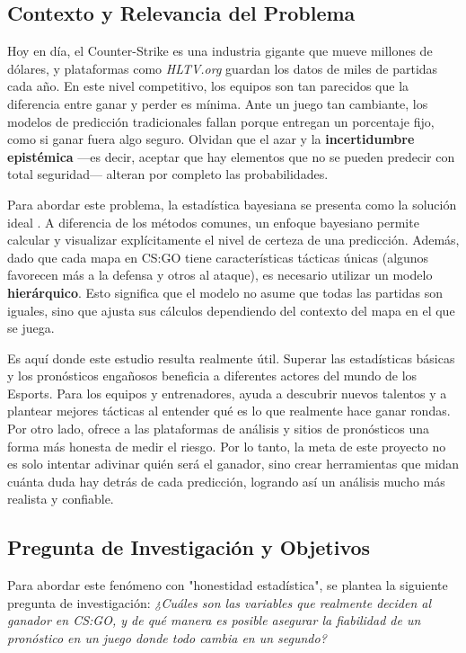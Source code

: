 \documentclass[twocolumn,10pt]{article}
\begin{document}
\subsection{Contexto y Relevancia del Problema}
Hoy en día, el Counter-Strike es una industria gigante que mueve millones de dólares, y plataformas como \textit{HLTV.org} guardan los datos de miles de partidas cada año. En este nivel competitivo, los equipos son tan parecidos que la diferencia entre ganar y perder es mínima. Ante un juego tan cambiante, los modelos de predicción tradicionales fallan porque entregan un porcentaje fijo, como si ganar fuera algo seguro. Olvidan que el azar y la \textbf{incertidumbre epistémica} —es decir, aceptar que hay elementos que no se pueden predecir con total seguridad— alteran por completo las probabilidades.

Para abordar este problema, la estadística bayesiana se presenta como la solución ideal \cite{mcgrayne2011theory}. A diferencia de los métodos comunes, un enfoque bayesiano permite calcular y visualizar explícitamente el nivel de certeza de una predicción. Además, dado que cada mapa en CS:GO tiene características tácticas únicas (algunos favorecen más a la defensa y otros al ataque), es necesario utilizar un modelo \textbf{hierárquico}. Esto significa que el modelo no asume que todas las partidas son iguales, sino que ajusta sus cálculos dependiendo del contexto del mapa en el que se juega.

Es aquí donde este estudio resulta realmente útil. Superar las estadísticas básicas y los pronósticos engañosos beneficia a diferentes actores del mundo de los Esports. Para los equipos y entrenadores, ayuda a descubrir nuevos talentos y a plantear mejores tácticas al entender qué es lo que realmente hace ganar rondas. Por otro lado, ofrece a las plataformas de análisis y sitios de pronósticos una forma más honesta de medir el riesgo. Por lo tanto, la meta de este proyecto no es solo intentar adivinar quién será el ganador, sino crear herramientas que midan cuánta duda hay detrás de cada predicción, logrando así un análisis mucho más realista y confiable.

\subsection{Pregunta de Investigación y Objetivos}
Para abordar este fenómeno con "honestidad estadística", se plantea la siguiente pregunta de investigación: \textit{¿Cuáles son las variables que realmente deciden al ganador en CS:GO, y de qué manera es posible asegurar la fiabilidad de un pronóstico en un juego donde todo cambia en un segundo?}
\end{document}
